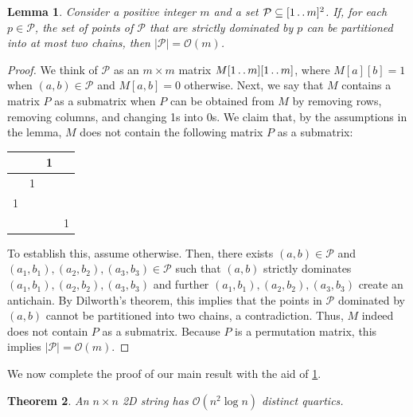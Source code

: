 \documentclass[11pt,letterpaper]{article}
\newcommand{\cO}{\mathcal{O}}
\def\dd{\mathinner{.\,.}}
\renewcommand{\P}{\mathcal{P}}
\newtheorem{theorem}{Theorem}[section]
\newtheorem{lemma}[theorem]{Lemma}
\begin{document}
\begin{lemma}\label{lem:geom}
Consider a positive integer $m$ and a set $\P \subseteq [1 \dd m]^2$.
If, for each $p \in \P$, the set
of points of $\P$ that are strictly dominated by $p$
can be partitioned into at most two chains,
then $|\P|=\cO(m)$.
\end{lemma}

\begin{proof}
We think of $\P$ as an $m\times m$ matrix $M[1\dd m][1\dd m]$, where $M[a][b]=1$ when $(a,b)\in \P$ and
$M[a,b]=0$ otherwise. Next, we say that $M$ contains a matrix $P$ as a submatrix when $P$ can be obtained
from $M$ by removing rows, removing columns, and changing 1s into 0s. We claim that, by the assumptions
in the lemma, $M$ does not contain the following matrix $P$ as a submatrix:
\begin{center}
\begin{tabular}{ |c|c|c|c| } 
 \hline
 & &  1 & \\ 
 \hline
 & 1 &  & \\ 
 \hline
 1 & &  & \\ 
 \hline
 & &  & 1 \\ 
 \hline
\end{tabular}
\end{center}
To establish this, assume otherwise. Then, there exists $(a,b)\in \P$ and $(a_{1},b_{1}),(a_{2},b_{2}),(a_{3},b_{3})\in \P$
such that $(a,b)$ strictly dominates $(a_{1},b_{1}),(a_{2},b_{2}),(a_{3},b_{3})$ and further
$(a_{1},b_{1}),(a_{2},b_{2}),(a_{3},b_{3})$ create an antichain. By Dilworth's theorem, this implies that
the points in $\P$ dominated by $(a,b)$ cannot be partitioned into two chains, a contradiction.
Thus, $M$ indeed does not contain $P$ as a submatrix. Because $P$ is a permutation matrix,
this implies $|\P|=\cO(m)$.
\end{proof}

We now complete the proof of our main result with the aid of \cref{lem:geom}.


\begin{theorem}\label{thm:main}
An $n \times n$ 2D string has $\cO(n^2 \log n)$ distinct quartics.
\end{theorem}
\end{document}
